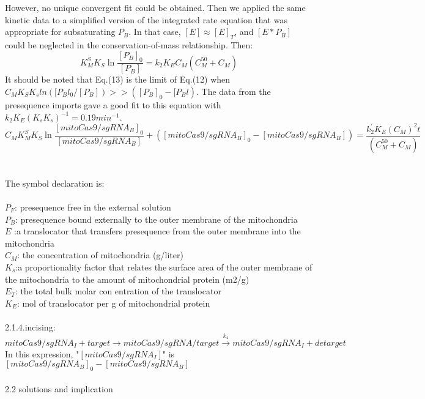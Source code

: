 \documentclass[UTF8]{ctexart}%
\begin{document}
However, no unique convergent fit could be obtained. Then we applied the same kinetic data to a simplified version of the integrated rate equation that was appropriate for subsaturating $P_B$. In that case,  $[E] \approx [E]_T$, and $[E*P_B]$ could be neglected in the conservation-of-mass relationship. Then:
\begin{equation}
K_M^SK_S\ln\frac{[P_B]_0}{[P_B]}=k_2K_EC_M (C_M^{50}+C_M)
\end{equation}
It should be noted that Eq.(13) is the limit of Eq.(12) when $C_MK_S K_sln([P_Bl_0/[P_B]) >> ([P_B]_0 - [P_Bl)$. The data from the presequence imports gave a good fit to this equation with $k_2K_E(K_s K_s)^{-1} = 0.19 min^{-1}$.
	\begin{displaymath}
	C_MK_M^SK_S\ln\frac{[mitoCas9/sgRNA_B]_0}{[mitoCas9/sgRNA_B]}+([mitoCas9/sgRNA_B]_0-[mitoCas9/sgRNA_B])=\frac {k_2^{'}K_E(C_M)^2 t}{(C_M^{50}+C_M)}
	\end{displaymath}
	\\\\
	The symbol declaration is:\\\\
	$P_F$: presequence free in the external  solution\\
	$P_B$: presequence bound externally to the outer membrane of the mitochondria\\
	$E$ :a translocator that transfers presequence from the outer membrane into the mitochondria\\
	$C_M$: the concentration of mitochondria (g/liter)\\
	$K_s$:a proportionality factor that relates the surface area of the outer membrane of the mitochondria to the amount of mitochondrial protein (m2/g) \\
	$E_T$: the total bulk molar con entration of the translocator\\
	$K_E$: mol of translocator per g of mitochondrial protein
	\\\\ 
	2.1.4.incising:
	\begin{displaymath}
	mitoCas9/sgRNA_I+target\longrightarrow mitoCas9/sgRNA/target\stackrel{k_4} {\longrightarrow} mitoCas9/sgRNA_I+detarget
	\end{displaymath}
	In this expression, "$[mitoCas9/sgRNA_I]$" is $ [mitoCas9/sgRNA_B]_0-[mitoCas9/sgRNA_B]$ 
	\\\\
	{\Large 2.2 solutions and implication} 
	\\\\
\end{document}

